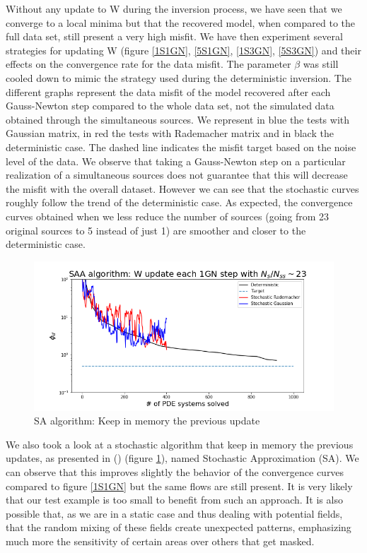 \documentclass[twoside]{article}
\begin{document}
Without any update to W during the inversion process, we have seen that we converge to a local minima but that the recovered model, when compared to the full data set, still present a very high misfit. We have then experiment several strategies for updating W (figure \ref{1S1GN}, \ref{5S1GN}, \ref{1S3GN}, \ref{5S3GN}) and their effects on the convergence rate for the data misfit. The parameter $\beta$ was still cooled down to mimic the strategy used during the deterministic inversion. The different graphs represent the data misfit of the model recovered after each Gauss-Newton step compared to the whole data set, not the simulated data obtained through the simultaneous sources. We represent in blue the tests with Gaussian matrix, in red the tests with Rademacher matrix and in black the deterministic case. The dashed line indicates the misfit target based on the noise level of the data. We observe that taking a Gauss-Newton step on a particular realization of a simultaneous sources does not guarantee that this will decrease the misfit with the overall dataset. However we can see that the stochastic curves roughly follow the trend of the deterministic case.  As expected, the convergence curves obtained when we less reduce the number of sources (going from 23 original sources to 5 instead of just 1) are smoother and closer to the deterministic case.


\begin{figure}[t!]
    \centering
    \includegraphics[width=0.5\linewidth]{figures/SAA_algo.png}
    \caption{SA algorithm: Keep in memory the previous update}
    \label{SAA}
\end{figure}

We also took a look at a stochastic algorithm that keep in memory the previous updates, as presented in (\cite{HCH:2012}) (figure \ref{SAA}), named Stochastic Approximation (SA). We can observe that this improves slightly the behavior of the convergence curves compared to figure \ref{1S1GN} but the same flows are still present.
It is very likely that our test example is too small to benefit from such an approach. It is also possible that, as we are in a static case and thus dealing with potential fields, that the random mixing of these fields create unexpected patterns, emphasizing much more the sensitivity of certain areas over others that get masked.
\end{document}
